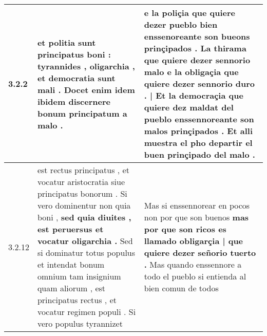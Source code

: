 \begin{tabular}{|p{1cm}|p{6.5cm}|p{6.5cm}|}

\hline
3.2.2 & et politia sunt principatus boni : tyrannides , \textbf{ oligarchia , } et democratia sunt mali . Docet enim idem ibidem discernere bonum principatum a malo . & e la poliçia que quiere dezer pueblo bien enssenoreante son bueons prinçipados . La thirama que quiere dezer sennorio malo \textbf{ e la obligaçia que quiere dezer sennorio duro . | Et la democraçia que quiere dez maldat del pueblo } enssennoreante son malos prinçipados . Et alli muestra el pho departir el buen prinçipado del malo . \\\hline
3.2.12 & est rectus principatus , et vocatur aristocratia siue principatus bonorum . Si vero dominentur non quia boni , \textbf{ sed quia diuites , est peruersus et vocatur oligarchia . } Sed si dominatur totus populus et intendat bonum omnium tam insignium quam aliorum , est principatus rectus , et vocatur regimen populi . Si vero populus tyrannizet & Mas si enssennorear en pocos non por que son buenos \textbf{ mas por que son ricos es llamado obligarçia | que quiere dezer señorio tuerto . } Mas quando enssennore a todo el pueblo si entienda al bien comun de todos \\\hline

\end{tabular}
